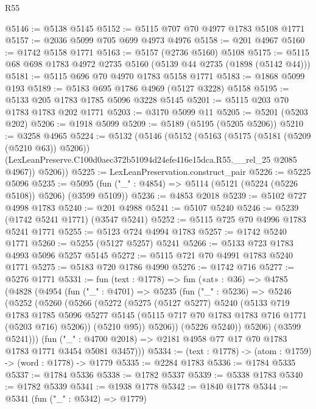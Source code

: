 \begin{lexlean}{R55}
\begin{coremodule}
@5146 := @5138 @5145
@5152 := @5115 @707 @70 @4977 @1783 @5108 @1771
@5157 := @2036 @5099 @705 @699 @4973 @4976
@5158 := @201 @4967
@5160 := @1742 @5158 @1771
@5163 := @5157 (@2736 @5160) @5108
@5175 := @5115 @68 @698 @1783 @4972 @2735 @5160 (@5139 @44 @2735 (@1898 (@5142 @44)))
@5181 := @5115 @696 @70 @4970 @1783 @5158 @1771
@5183 := @1868 @5099 @193
@5189 := @5183 @695 @1786 @4969 (@5127 @3228) @5158
@5195 := @5133 @205 @1783 @1785 @5096 @3228 @5145
@5201 := @5115 @203 @70 @1783 @1783 @202 @1771
@5203 := @3170 @5099 @11
@5205 := @5201 (@5203 @202)
@5206 := @1918 @5099
@5209 := @5189 (@5195 (@5205 @5206))
@5210 := @3258 @4965
@5224 := @5132
    (@5146
      (@5152
        (@5163
          (@5175 (@5181 (@5209 (@5210 @63)) @5206))
          (LexLeanPreserve.C100d0aec372b51094d24efe416e15dca.R55.__rel_25 @2085 @4967))
        @5206))
@5225 := LexLeanPreservation.construct_pair
@5226 := @5225 @5096
@5235 := @5095 (fun ("_" : @4854) => @5114 (@5121 (@5224 (@5226 @5108)) @5206) (@3599 @5109))
@5236 := @4853 @2018
@5239 := @5102 @727 @4998 @1783
@5240 := @201 @4988
@5241 := @5107 @5240
@5246 := @5239 (@1742 @5241 @1771) (@3547 @5241)
@5252 := @5115 @725 @70 @4996 @1783 @5241 @1771
@5255 := @5123 @724 @4994 @1783
@5257 := @1742 @5240 @1771
@5260 := @5255 (@5127 @5257) @5241
@5266 := @5133 @723 @1783 @4993 @5096 @5257 @5145
@5272 := @5115 @721 @70 @4991 @1783 @5240 @1771
@5275 := @5183 @720 @1786 @4990
@5276 := @1742 @716
@5277 := @5276 @1771
@5331 := fun (text : @1778) =>
  fun («at» : @36) =>
  @4785
    (@4828
      (@4954
        (fun ("_" : @4701) =>
        @5235
          (fun ("_" : @5236) =>
          @5246
            (@5252
              (@5260
                (@5266
                  (@5272
                    (@5275
                      (@5127 @5277)
                      @5240
                      (@5133
                        @719
                        @1783
                        @1785
                        @5096
                        @5277
                        @5145
                        (@5115 @717 @70 @1783 @1783 @716 @1771 (@5203 @716) @5206))
                      (@5210 @95))
                    @5206))
                (@5226 @5240))
              @5206)
            (@3599 @5241)))
        (fun ("_" : @4700 @2018) => @2181 @4958 @77 @17 @70 @1783 @1783 @1771 @3454 @5081 @3457)))
@5334 := (text : @1778) -> (atom : @1759) -> (word : @1778) -> @1779
@5335 := @2284 @1783
@5336 := @1784 @5335
@5337 := @1784 @5336
@5338 := @1782 @5337
@5339 := @5338 @1783
@5340 := @1782 @5339
@5341 := @1938 @1778
@5342 := @1840 @1778
@5344 := @5341 (fun ("_" : @5342) => @1779)

\end{coremodule}
\end{lexlean}
